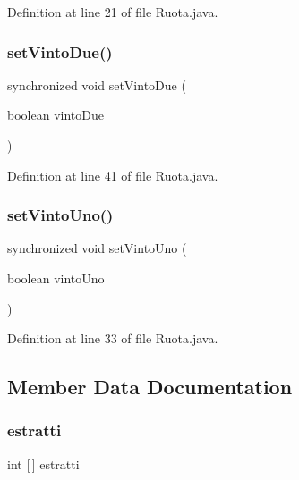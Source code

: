 Definition at line 21 of file Ruota.\+java.

\mbox{\label{classmain_1_1_ruota_ab033e20bad03089115af5905cd091752}} 
\subsubsection{\texorpdfstring{set\+Vinto\+Due()}{setVintoDue()}}
{\footnotesize\ttfamily synchronized void set\+Vinto\+Due (\begin{DoxyParamCaption}\item[{boolean}]{vinto\+Due }\end{DoxyParamCaption})}



Definition at line 41 of file Ruota.\+java.

\mbox{\label{classmain_1_1_ruota_a24f43a149e8280c81c9718eada8ece10}} 
\subsubsection{\texorpdfstring{set\+Vinto\+Uno()}{setVintoUno()}}
{\footnotesize\ttfamily synchronized void set\+Vinto\+Uno (\begin{DoxyParamCaption}\item[{boolean}]{vinto\+Uno }\end{DoxyParamCaption})}



Definition at line 33 of file Ruota.\+java.



\subsection{Member Data Documentation}
\mbox{\label{classmain_1_1_ruota_a7be91eda031da75cc73826a2a0196c6c}} 
\subsubsection{\texorpdfstring{estratti}{estratti}}
{\footnotesize\ttfamily int \mbox{[}$\,$\mbox{]} estratti\hspace{0.3cm}{\ttfamily [private]}}



